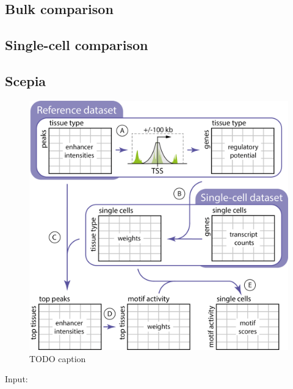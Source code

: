 \subsection{Bulk comparison}

 

\subsection{Single-cell comparison}


\subsection{Scepia}

\begin{figure}
    \centering
    \includegraphics[width=1\linewidth]{ch.scepia/imgs/overview.png}
    \caption{TODO caption}
    \label{fig:enter-label}
\end{figure}

\noindent
Input:

